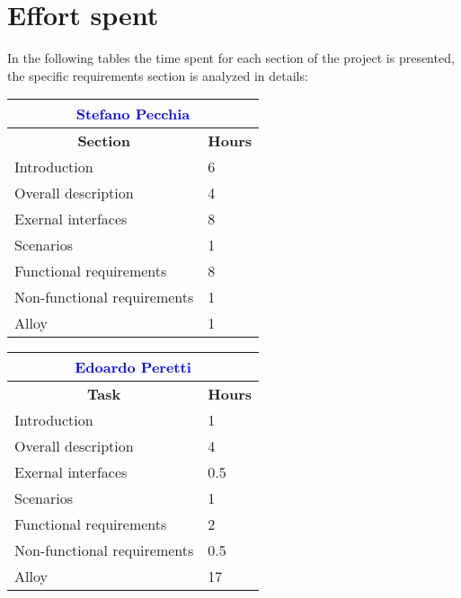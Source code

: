 \chapter{Effort spent}
In the following tables the time spent for each section of the project is presented, the specific requirements section is analyzed in details:

\renewcommand\arraystretch{1.5}
\begin{table}[ht]
\centering
\begin{tabular}{|l|l|}
\multicolumn{2}{c}{\textcolor{Blue}{\textbf{Stefano Pecchia}}} \\\hline
\multicolumn{1}{|c|}{\textbf{Section}} & \multicolumn{1}{|c|}{\textbf{Hours}} \\\hline
    Introduction & 6  
    \\ \hline
    Overall description & 4  
    \\ \hline 
    Exernal interfaces & 8  
     \\ \hline 
    Scenarios & 1  
       \\ \hline 
    Functional requirements & 8  
      \\ \hline 
      Non-functional requirements & 1
      \\ \hline
    Alloy & 1
	\\ \hline
	\end{tabular} \hspace{2.5em}
	\begin{tabular}{|l|l|}
\multicolumn{2}{c}{\textcolor{Blue}{\textbf{Edoardo Peretti}}} \\\hline
\multicolumn{1}{|c|}{\textbf{Task}} & \multicolumn{1}{|c|}{\textbf{Hours}} \\\hline
    Introduction & 1
    \\ \hline
    Overall description & 4  
    \\ \hline 
    Exernal interfaces & 0.5
     \\ \hline 
    Scenarios & 1  
       \\ \hline 
    Functional requirements & 2
      \\ \hline 
      Non-functional requirements & 0.5
    \\ \hline
    Alloy & 17
	\\ \hline
\end{tabular}
\end{table}